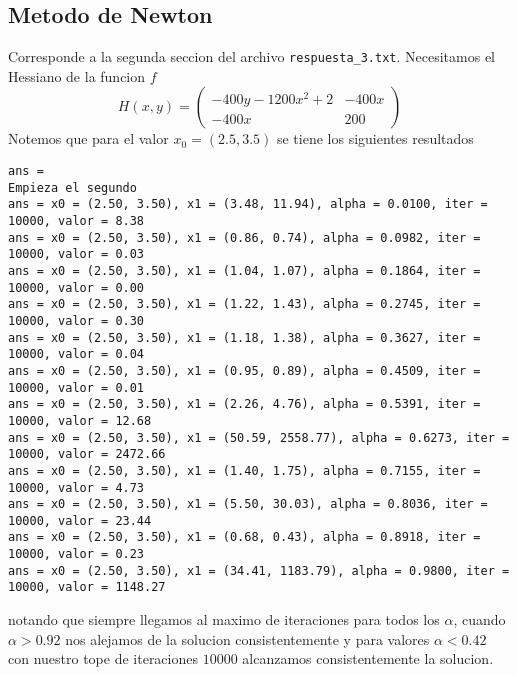 \documentclass[letterpaper]{article}
\begin{document}
\subsection*{Metodo de Newton}
\noindent Corresponde a la segunda seccion del archivo
\texttt{respuesta\_3.txt}. Necesitamos el Hessiano de la funcion \(f\)
\[ H (x,y) =
  \begin{pmatrix}
    -400 y - 1200 x^2 + 2 & -400 x \\
    -400 x & 200
  \end{pmatrix}
\]
Notemos que para el valor \(x_0 = (2.5, 3.5)\) se tiene los siguientes resultados
\begin{verbatim}
ans =
Empieza el segundo
ans = x0 = (2.50, 3.50), x1 = (3.48, 11.94), alpha = 0.0100, iter = 10000, valor = 8.38
ans = x0 = (2.50, 3.50), x1 = (0.86, 0.74), alpha = 0.0982, iter = 10000, valor = 0.03
ans = x0 = (2.50, 3.50), x1 = (1.04, 1.07), alpha = 0.1864, iter = 10000, valor = 0.00
ans = x0 = (2.50, 3.50), x1 = (1.22, 1.43), alpha = 0.2745, iter = 10000, valor = 0.30
ans = x0 = (2.50, 3.50), x1 = (1.18, 1.38), alpha = 0.3627, iter = 10000, valor = 0.04
ans = x0 = (2.50, 3.50), x1 = (0.95, 0.89), alpha = 0.4509, iter = 10000, valor = 0.01
ans = x0 = (2.50, 3.50), x1 = (2.26, 4.76), alpha = 0.5391, iter = 10000, valor = 12.68
ans = x0 = (2.50, 3.50), x1 = (50.59, 2558.77), alpha = 0.6273, iter = 10000, valor = 2472.66
ans = x0 = (2.50, 3.50), x1 = (1.40, 1.75), alpha = 0.7155, iter = 10000, valor = 4.73
ans = x0 = (2.50, 3.50), x1 = (5.50, 30.03), alpha = 0.8036, iter = 10000, valor = 23.44
ans = x0 = (2.50, 3.50), x1 = (0.68, 0.43), alpha = 0.8918, iter = 10000, valor = 0.23
ans = x0 = (2.50, 3.50), x1 = (34.41, 1183.79), alpha = 0.9800, iter = 10000, valor = 1148.27
\end{verbatim}
notando que siempre llegamos al maximo de iteraciones para todos los
\(\alpha\), cuando \(\alpha > 0.92\) nos alejamos de la solucion
consistentemente y para valores \(\alpha < 0.42\) con nuestro tope de
iteraciones \(10000\) alcanzamos consistentemente la solucion.
\end{document}
